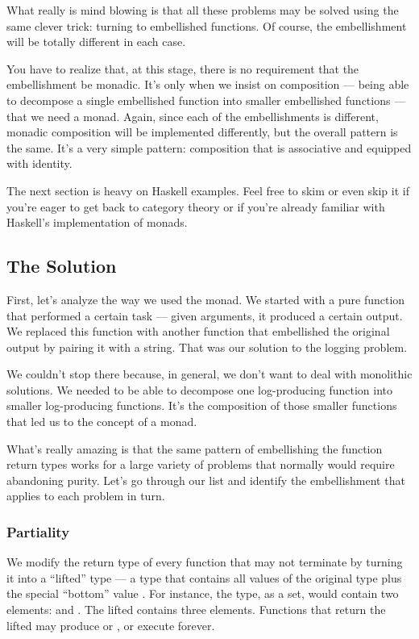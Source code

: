 What really is mind blowing is that all these problems may be solved
using the same clever trick: turning to embellished functions. Of
course, the embellishment will be totally different in each case.

You have to realize that, at this stage, there is no requirement that
the embellishment be monadic. It's only when we insist on composition
--- being able to decompose a single embellished function into smaller
embellished functions --- that we need a monad. Again, since each of the
embellishments is different, monadic composition will be implemented
differently, but the overall pattern is the same. It's a very simple
pattern: composition that is associative and equipped with identity.

The next section is heavy on Haskell examples. Feel free to skim or even
skip it if you're eager to get back to category theory or if you're
already familiar with Haskell's implementation of monads.

\subsection{The Solution}\label{the-solution}

First, let's analyze the way we used the  monad. We
started with a pure function that performed a certain task --- given
arguments, it produced a certain output. We replaced this function with
another function that embellished the original output by pairing it with
a string. That was our solution to the logging problem.

We couldn't stop there because, in general, we don't want to deal with
monolithic solutions. We needed to be able to decompose one
log-producing function into smaller log-producing functions. It's the
composition of those smaller functions that led us to the concept of a
monad.

What's really amazing is that the same pattern of embellishing the
function return types works for a large variety of problems that
normally would require abandoning purity. Let's go through our list and
identify the embellishment that applies to each problem in turn.

\subsubsection{Partiality}\label{partiality}

We modify the return type of every function that may not terminate by
turning it into a ``lifted'' type --- a type that contains all values of
the original type plus the special ``bottom'' value . For
instance, the  type, as a set, would contain two elements:
 and . The lifted  contains
three elements. Functions that return the lifted  may
produce  or , or execute forever.

